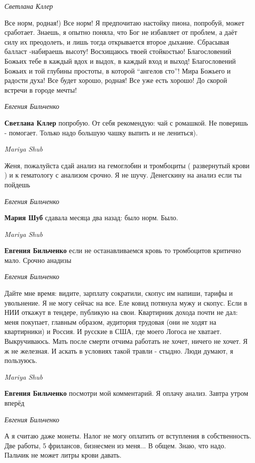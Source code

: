 \emph{Светлана Кллер}

Все норм, родная!) Все норм! Я предпочитаю настойку пиона, попробуй, может
сработает. Знаешь, я опытно поняла, что Бог не избавляет от проблем, а даёт
силу их преодолеть, и лишь тогда открывается второе дыхание. Сбрасывая балласт
-набираешь высоту! Восхищаюсь твоей стойкостью! Благословений Божьих тебе в
каждый вдох и выдох, в каждый вход и выход! Благословений Божьих и той глубины
простоты, в которой \enquote{ангелов сто}! Мира Божьего и радости духа! Все будет
хорошо, родная! Все уже есть хорошо! До скорой встречи в городе мечты!

\emph{Евгения Бильченко}

\textbf{Светлана Кллер} попробую. От себя рекомендую: чай с ромашкой. Не поверишь -
помогает. Только надо большую чашку выпить и не лениться).

\emph{Mariya Shub}

Женя, пожалуйста сдай анализ на гемоглобин и тромбоциты ( развернутый крови ) и
к гематологу с анализом срочно. Я не шучу. Денегскину на анализ если ты
пойдешь

\emph{Евгения Бильченко}

\textbf{Мария Шуб} сдавала месяца два назад: было норм. Было.

\emph{Mariya Shub}

\textbf{Евгения Бильченко} если не останавливаемся кровь то тромбоцитов критично мало. Срочно анадизы

\emph{Евгения Бильченко}

Дайте мне время: видите, зарплату сократили, скопус им напиши, тарифы и
увольнение. Я не могу сейчас на все. Еле ковид потянула мужу и скопус. Если в
НИИ откажут в тендере, публикую на свои. Квартирник дохода почти не дал: меня
покупает, главным образом, аудитория трудовая (они не ходят на квартирники) и
Россия. И русские в США, где моего Логоса не хватает. Выкручиваюсь. Мать после
смерти отчима работать не хочет, ничего не хочет. Я ж не железная. И аскать в
условиях такой травли - стыдно. Люди думают, я пользуюсь.

\emph{Mariya Shub}

\textbf{Евгения Бильченко} посмотри мой комментарий. Я оплачу анализ. Завтра
утром вперёд

\emph{Евгения Бильченко}

А я считаю даже монеты. Налог не могу оплатить от вступления в собственность.
Две работы, 5 фрилансов, бизнесмен из меня... В общем. Знаю, что надо. Пальчик
не может литры крови давать.

